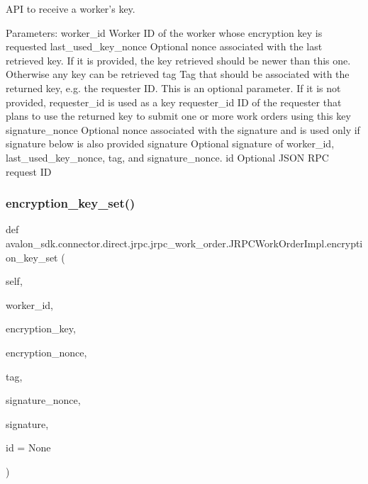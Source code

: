 \begin{DoxyVerb}API to receive a worker's key.

Parameters:
worker_id           Worker ID of the worker whose encryption key
            is requested
last_used_key_nonce Optional nonce associated with the last retrieved
            key. If it is provided, the key retrieved should
            be newer than this one.
            Otherwise any key can be retrieved
tag                 Tag that should be associated with the returned
            key, e.g. the requester ID. This is an optional
            parameter. If it is not provided, requester_id is
            used as a key
requester_id        ID of the requester that plans to use
            the returned key to submit one or more work orders
            using this key
signature_nonce     Optional nonce associated with the signature and
            is used only if signature below is also provided
signature           Optional signature of worker_id,
            last_used_key_nonce, tag, and signature_nonce.
id                  Optional JSON RPC request ID
\end{DoxyVerb}
 \mbox{\label{classavalon__sdk_1_1connector_1_1direct_1_1jrpc_1_1jrpc__work__order_1_1JRPCWorkOrderImpl_a556dba59e738309f2bac9ba578aabae6}} 
\subsubsection{\texorpdfstring{encryption\+\_\+key\+\_\+set()}{encryption\_key\_set()}}
{\footnotesize\ttfamily def avalon\+\_\+sdk.\+connector.\+direct.\+jrpc.\+jrpc\+\_\+work\+\_\+order.\+J\+R\+P\+C\+Work\+Order\+Impl.\+encryption\+\_\+key\+\_\+set (\begin{DoxyParamCaption}\item[{}]{self,  }\item[{}]{worker\+\_\+id,  }\item[{}]{encryption\+\_\+key,  }\item[{}]{encryption\+\_\+nonce,  }\item[{}]{tag,  }\item[{}]{signature\+\_\+nonce,  }\item[{}]{signature,  }\item[{}]{id = {\ttfamily None} }\end{DoxyParamCaption})}

